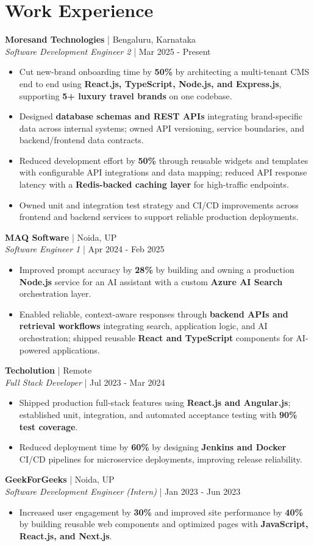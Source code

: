 \documentclass[a4paper,10pt]{article}
\newcommand{\role}[4]{\textbf{#1} | #2\\\textit{#3} | #4\par}
\begin{document}
\section{Work Experience}
\role{Moresand Technologies}{Bengaluru, Karnataka}{Software Development Engineer 2}{Mar 2025 - Present}
\begin{itemize}
\item Cut new-brand onboarding time by \textbf{50\%} by architecting a multi-tenant CMS end to end using \textbf{React.js, TypeScript, Node.js, and Express.js}, supporting \textbf{5+ luxury travel brands} on one codebase.
\item Designed \textbf{database schemas and REST APIs} integrating brand-specific data across internal systems; owned API versioning, service boundaries, and backend/frontend data contracts.
\item Reduced development effort by \textbf{50\%} through reusable widgets and templates with configurable API integrations and data mapping; reduced API response latency with a \textbf{Redis-backed caching layer} for high-traffic endpoints.
\item Owned unit and integration test strategy and CI/CD improvements across frontend and backend services to support reliable production deployments.
\end{itemize}
\role{MAQ Software}{Noida, UP}{Software Engineer 1}{Apr 2024 - Feb 2025}
\begin{itemize}
\item Improved prompt accuracy by \textbf{28\%} by building and owning a production \textbf{Node.js} service for an AI assistant with a custom \textbf{Azure AI Search} orchestration layer.
\item Enabled reliable, context-aware responses through \textbf{backend APIs and retrieval workflows} integrating search, application logic, and AI orchestration; shipped reusable \textbf{React and TypeScript} components for AI-powered applications.
\end{itemize}
\role{Techolution}{Remote}{Full Stack Developer}{Jul 2023 - Mar 2024}
\begin{itemize}
\item Shipped production full-stack features using \textbf{React.js and Angular.js}; established unit, integration, and automated acceptance testing with \textbf{90\% test coverage}.
\item Reduced deployment time by \textbf{60\%} by designing \textbf{Jenkins and Docker} CI/CD pipelines for microservice deployments, improving release reliability.
\end{itemize}
\role{GeekForGeeks}{Noida, UP}{Software Development Engineer (Intern)}{Jan 2023 - Jun 2023}
\begin{itemize}
\item Increased user engagement by \textbf{30\%} and improved site performance by \textbf{40\%} by building reusable web components and optimized pages with \textbf{JavaScript, React.js, and Next.js}.
\end{itemize}
\end{document}
